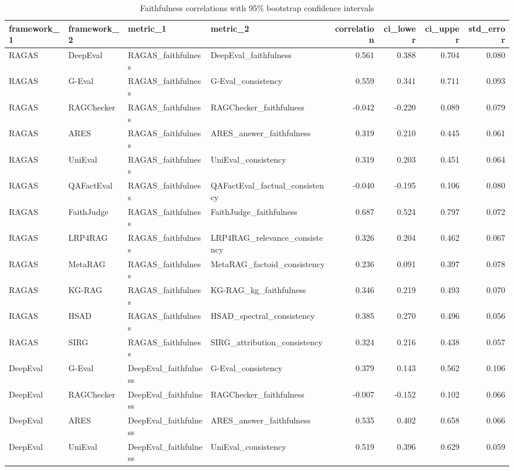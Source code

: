 \begin{table}
\caption{Faithfulness correlations with 95\% bootstrap confidence intervals}
\label{tab:corr_ci}
\begin{tabular}{llllrrrr}
\toprule
framework_1 & framework_2 & metric_1 & metric_2 & correlation & ci_lower & ci_upper & std_error \\
\midrule
RAGAS & DeepEval & RAGAS_faithfulness & DeepEval_faithfulness & 0.561 & 0.388 & 0.704 & 0.080 \\
RAGAS & G-Eval & RAGAS_faithfulness & G-Eval_consistency & 0.559 & 0.341 & 0.711 & 0.093 \\
RAGAS & RAGChecker & RAGAS_faithfulness & RAGChecker_faithfulness & -0.042 & -0.220 & 0.089 & 0.079 \\
RAGAS & ARES & RAGAS_faithfulness & ARES_answer_faithfulness & 0.319 & 0.210 & 0.445 & 0.061 \\
RAGAS & UniEval & RAGAS_faithfulness & UniEval_consistency & 0.319 & 0.203 & 0.451 & 0.064 \\
RAGAS & QAFactEval & RAGAS_faithfulness & QAFactEval_factual_consistency & -0.040 & -0.195 & 0.106 & 0.080 \\
RAGAS & FaithJudge & RAGAS_faithfulness & FaithJudge_faithfulness & 0.687 & 0.524 & 0.797 & 0.072 \\
RAGAS & LRP4RAG & RAGAS_faithfulness & LRP4RAG_relevance_consistency & 0.326 & 0.204 & 0.462 & 0.067 \\
RAGAS & MetaRAG & RAGAS_faithfulness & MetaRAG_factoid_consistency & 0.236 & 0.091 & 0.397 & 0.078 \\
RAGAS & KG-RAG & RAGAS_faithfulness & KG-RAG_kg_faithfulness & 0.346 & 0.219 & 0.493 & 0.070 \\
RAGAS & HSAD & RAGAS_faithfulness & HSAD_spectral_consistency & 0.385 & 0.270 & 0.496 & 0.056 \\
RAGAS & SIRG & RAGAS_faithfulness & SIRG_attribution_consistency & 0.324 & 0.216 & 0.438 & 0.057 \\
DeepEval & G-Eval & DeepEval_faithfulness & G-Eval_consistency & 0.379 & 0.143 & 0.562 & 0.106 \\
DeepEval & RAGChecker & DeepEval_faithfulness & RAGChecker_faithfulness & -0.007 & -0.152 & 0.102 & 0.066 \\
DeepEval & ARES & DeepEval_faithfulness & ARES_answer_faithfulness & 0.535 & 0.402 & 0.658 & 0.066 \\
DeepEval & UniEval & DeepEval_faithfulness & UniEval_consistency & 0.519 & 0.396 & 0.629 & 0.059 \\

\end{tabular}
\end{table}
